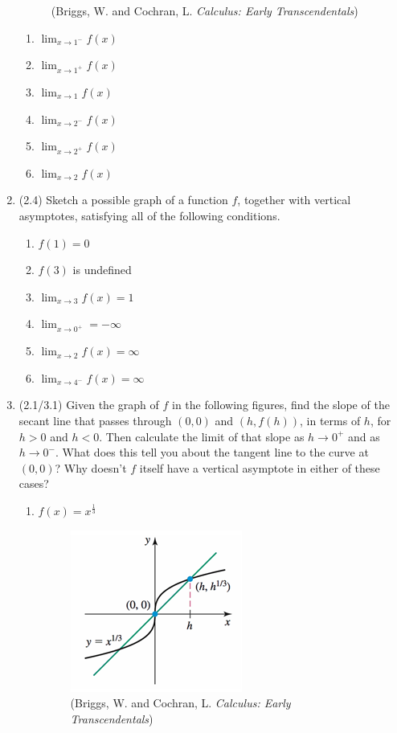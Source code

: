 \documentclass[11pt,letterpaper]{article}
\begin{document}
\begin{enumerate}
\begin{figure}[h]
\begin{center}
\caption{(Briggs, W. and Cochran, L. \emph{Calculus: Early Transcendentals})}
\end{center}
\end{figure}
\begin{enumerate}
\item $\lim_{x\to 1^-}f(x)$
\item $\lim_{x\to 1^+}f(x)$
\item $\lim_{x\to 1}f(x)$
\item $\lim_{x\to 2^-}f(x)$
\item $\lim_{x\to 2^+}f(x)$
\item $\lim_{x\to 2}f(x)$
\end{enumerate}
	
\item (2.4) Sketch a possible graph of a function $f$, together with vertical asymptotes, satisfying all of the following conditions.
\begin{enumerate}
\item $f(1)=0$
\item $f(3)$ is undefined
\item $\lim_{x\to 3}f(x)=1$
\item $\lim_{x\to 0^+}=-\infty$
\item $\lim_{x\to 2}f(x)=\infty$
\item $\lim_{x\to 4^-}f(x)=\infty$
\end{enumerate}	

\item (2.1/3.1) Given the graph of $f$ in the following figures, find the slope of the secant line that passes through $(0,0)$ and $(h,f(h))$, in terms of $h$, for $h>0$ and $h<0$.  Then calculate the limit of that slope as $h\to 0^+$ and as $h\to 0^-$.  What does this tell you about the tangent line to the curve at $(0,0)$?  Why doesn't $f$ itself have a vertical asymptote in either of these cases?
\begin{enumerate}
\item $f(x)=x^{\frac{1}{3}}$
\vspace{-1pc}  
\begin{figure}[h]
\begin{center}
\includegraphics[scale=0.8]{Exam1pic4.png}
\caption{(Briggs, W. and Cochran, L. \emph{Calculus: Early Transcendentals})}
\end{center}
\end{figure}


\end{enumerate}
\end{enumerate}
\end{document}
